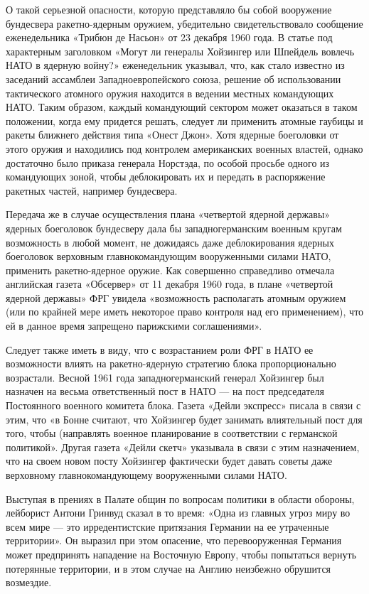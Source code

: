 \documentclass[12pt, a4paper, openany]{book}
\begin{document}
О такой серьезной опасности, которую представляло бы собой вооружение бундесвера ракетно-ядерным оружием, убедительно свидетельствовало сообщение еженедельника «Трибюн де Насьон» от 23 декабря 1960 года. В статье под характерным заголовком «Могут ли генералы Хойзингер или Шпейдель вовлечь НАТО в ядерную войну?» еженедельник указывал, что, как стало известно из заседаний ассамблеи Западноевропейского союза, решение об использовании тактического атомного оружия находится в ведении местных командующих НАТО. Таким образом, каждый командующий сектором может оказаться в таком положении, когда ему придется решать, следует ли применить атомные гаубицы и ракеты ближнего действия типа «Онест Джон». Хотя ядерные боеголовки от этого оружия и находились под контролем американских военных властей, однако достаточно было приказа генерала Норстэда, по особой просьбе одного из командующих зоной, чтобы деблокировать их и передать в распоряжение ракетных частей, например бундесвера.
	
Передача же в случае осуществления плана «четвертой ядерной державы» ядерных боеголовок бундесверу дала бы западногерманским военным кругам возможность в любой момент, не дожидаясь даже деблокирования ядерных боеголовок верховным главнокомандующим вооруженными силами НАТО, применить ракетно-ядерное оружие. Как совершенно справедливо отмечала английская газета «Обсервер» от 11 декабря 1960 года, в плане «четвертой ядерной державы» ФРГ увидела «возможность располагать атомным оружием (или по крайней мере иметь некоторое право контроля над его применением), что ей в данное время запрещено парижскими соглашениями».
	
Следует также иметь в виду, что с возрастанием роли ФРГ в НАТО ее возможности влиять на ракетно-ядерную стратегию блока пропорционально возрастали. Весной 1961 года западногерманский генерал Хойзингер был назначен на весьма ответственный пост в НАТО — на пост председателя Постоянного военного комитета блока. Газета «Дейли экспресс» писала в связи с этим, что «в Бонне считают, что Хойзингер будет занимать влиятельный пост для того, чтобы (направлять военное планирование в соответствии с германской политикой». Другая газета «Дейли скетч» указывала в связи с этим назначением, что на своем новом посту Хойзингер фактически будет давать советы даже верховному главнокомандующему вооруженными силами НАТО.
	
Выступая в прениях в Палате общин по вопросам политики в области обороны, лейборист Антони Гринвуд сказал в то время: «Одна из главных угроз миру во всем мире — это ирредентистские притязания Германии на ее утраченные территории». Он выразил при этом опасение, что перевооруженная Германия может предпринять нападение на Восточную Европу, чтобы попытаться вернуть потерянные территории, и в этом случае на Англию неизбежно обрушится возмездие.
	
\end{document}
